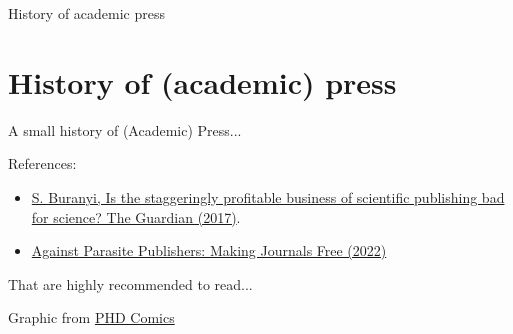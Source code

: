 \documentclass[10pt,compress,serif,aspectratio=169]{beamer}
\newcommand{\fig}[2]{\centering{\texttt{[image: \#2]}}}
\begin{document}
\begin{frame}[t]
  \begin{center}
  \vspace{3cm}
  {\huge History of academic press}\\
  \end{center}
\end{frame}


\section{History of (academic) press}
\begin{frame}[t]{A small history of (Academic) Press...}

  References:\\

  \begin{itemize}
    \item 
  \href{https://www.theguardian.com/science/2017/jun/27/profitable-business-scientific-publishing-bad-for-science}{S. Buranyi, Is the staggeringly profitable business of scientific publishing bad for science? The Guardian (2017)}.
  \item
    \href{https://doi.org/10.5281/zenodo.7212922}{Against Parasite Publishers: Making Journals Free (2022)}
\end{itemize}
    \vfill
\pause
  \begin{center}
    That are \alert{\Large highly} recommended to read...
  \end{center}
\vfill
  \fig{.5}{Open_Access_Explained}
  \begin{center}
    \small
    Graphic from \href{http://www.phdcomics.com/comics.php?f=1533}{PHD Comics}
  \end{center}
\end{frame}
\end{document}
